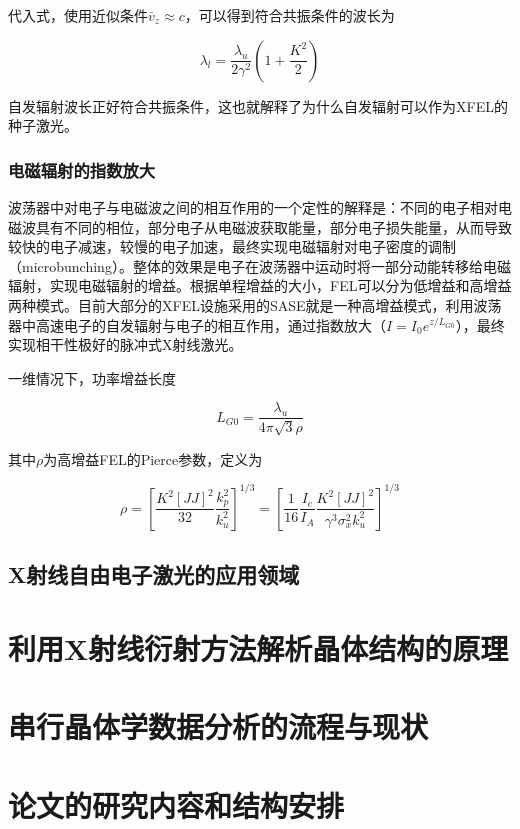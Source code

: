 代入式，使用近似条件$\bar{v}_{z} \approx c$，可以得到符合共振条件的波长为

\begin{equation}
\lambda_{l} = \frac{\lambda_{u}}{2\gamma ^{2}}(1 + \frac{K^{2}}{2})
\end{equation}

自发辐射波长正好符合共振条件，这也就解释了为什么自发辐射可以作为XFEL的种子激光。

\subsubsection{电磁辐射的指数放大}

波荡器中对电子与电磁波之间的相互作用的一个定性的解释是：不同的电子相对电磁波具有不同的相位，部分电子从电磁波获取能量，部分电子损失能量，从而导致较快的电子减速，较慢的电子加速，最终实现电磁辐射对电子密度的调制（microbunching）。整体的效果是电子在波荡器中运动时将一部分动能转移给电磁辐射，实现电磁辐射的增益。根据单程增益的大小，FEL可以分为低增益和高增益两种模式。目前大部分的XFEL设施采用的SASE就是一种高增益模式，利用波荡器中高速电子的自发辐射与电子的相互作用，通过指数放大（$I=I_{0}e^{z/L_{G0}}$），最终实现相干性极好的脉冲式X射线激光。

一维情况下，功率增益长度

\begin{equation}
L_{G0} = \frac{\lambda_{u}}{4\pi \sqrt{3}\rho}
\end{equation}

其中$\rho$为高增益FEL的Pierce参数，定义为

\begin{equation}
\rho 
= \left[\frac{K^{2}[JJ]^{2}}{32}\frac{k_{p}^{2}}{k_{u}^{2}}\right]^{1/3}
= \left[\frac{1}{16}\frac{I_{e}}{I_{A}}\frac{K^{2}[JJ]^{2}}{\gamma^{3}\sigma_{x}^{2}k_{u}^2}\right]^{1/3}
\end{equation}

\subsection{X射线自由电子激光的应用领域}

\section{利用X射线衍射方法解析晶体结构的原理}

\section{串行晶体学数据分析的流程与现状}

\section{论文的研究内容和结构安排}
